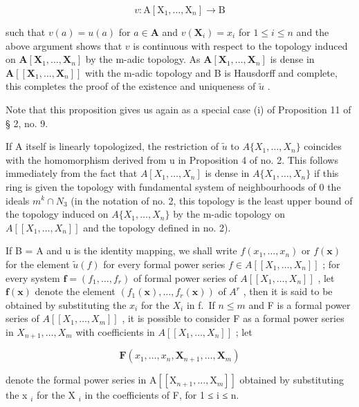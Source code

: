 \[
v \colon \mathrm{A} [ \mathrm{X} _ {1}, \dots , \mathrm{X} _ {n} ] \rightarrow \mathrm{B}
\]

such that \(v(a) = u(a)\) for \(a \in \mathbf{A}\) and \(v(\mathbf{X}_i) = x_i\) for \(1 \leqslant i \leqslant n\) and the above argument shows that \(v\) is continuous with respect to the topology induced on \(\mathbf{A}[\mathbf{X}_1, \ldots, \mathbf{X}_n]\) by the m-adic topology. As \(\mathbf{A}[\mathbf{X}_1, \ldots, \mathbf{X}_n]\) is dense in \(\mathbf{A}[[\mathbf{X}_1, \ldots, \mathbf{X}_n]]\) with the m-adic topology and B is Hausdorff and complete, this completes the proof of the existence and uniqueness of \(\tilde{u}\) .

Note that this proposition gives us again as a special case (i) of Proposition 11 of § 2, no. 9.

If A itself is linearly topologized, the restriction of \(\tilde{u}\) to \(A\{X_{1},\ldots,X_{n}\}\) coincides with the homomorphism derived from u in Proposition 4 of no. 2. This follows immediately from the fact that \(A[X_{1},\ldots,X_{n}]\) is dense in \(A\{X_{1},\ldots,X_{n}\}\) if this ring is given the topology with fundamental system of neighbourhoods of 0 the ideals \(m^{k}\cap N_{3}\) (in the notation of no. 2, this topology is the least upper bound of the topology induced on \(A\{X_{1},\ldots,X_{n}\}\) by the m-adic topology on \(A[[X_{1},\ldots,X_{n}]]\) and the topology defined in no. 2).

If B = A and u is the identity mapping, we shall write \(f(x_{1}, \ldots, x_{n})\) or \(f(\mathbf{x})\) for the element \(\tilde{u}(f)\) for every formal power series \(f \in A[[X_{1}, \ldots, X_{n}]]\) ; for every system \(\mathbf{f} = (f_{1}, \ldots, f_{r})\) of formal power series of \(A[[X_{1}, \ldots, X_{n}]]\) , let \(\mathbf{f}(\mathbf{x})\) denote the element \((f_{1}(\mathbf{x}), \ldots, f_{r}(\mathbf{x}))\) of \(A^{r}\) , then it is said to be obtained by substituting the \(x_{i}\) for the \(X_{i}\) in f.~If \(n \leqslant m\) and F is a formal power series of \(A[[X_{1}, \ldots, X_{m}]]\) , it is possible to consider F as a formal power series in \(X_{n+1}, \ldots, X_{m}\) with coefficients in \(A[[X_{1}, \ldots, X_{n}]]\) ; let

\[
\mathbf {F} (x _ {1}, \dots , x _ {n}, \mathbf {X} _ {n + 1}, \dots , \mathbf {X} _ {m})
\]

denote the formal power series in \(\mathrm{A}[[\mathrm{X}_{n+1}, \ldots, \mathrm{X}_{m}]]\) obtained by substituting the x \(_{i}\) for the X \(_{i}\) in the coefficients of F, for 1 ≤ i ≤ n.

